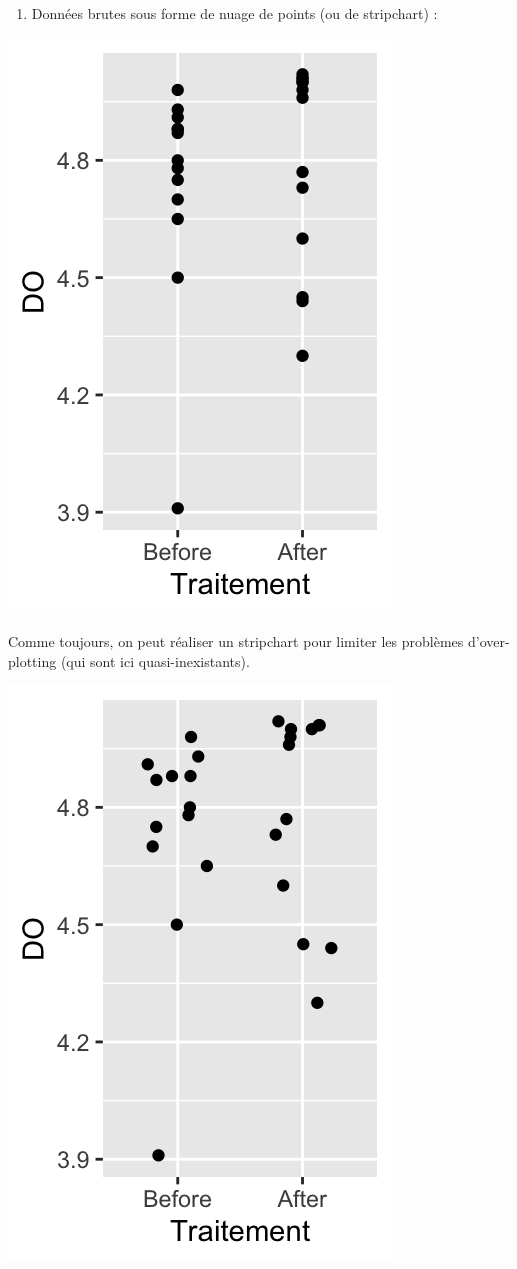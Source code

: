 \documentclass[a4paperpaper,]{article}
\newenvironment{Shaded}{\begin{snugshade}}{\end{snugshade}}
\newcommand{\DataTypeTok}[1]{\textcolor[rgb]{0.00,0.34,0.68}{#1}}
\newcommand{\DecValTok}[1]{\textcolor[rgb]{0.69,0.50,0.00}{#1}}
\newcommand{\FloatTok}[1]{\textcolor[rgb]{0.69,0.50,0.00}{#1}}
\newcommand{\KeywordTok}[1]{\textcolor[rgb]{0.12,0.11,0.11}{\textbf{#1}}}
\newcommand{\NormalTok}[1]{\textcolor[rgb]{0.12,0.11,0.11}{#1}}
\newcommand{\OperatorTok}[1]{\textcolor[rgb]{0.12,0.11,0.11}{#1}}
\newcommand{\StringTok}[1]{\textcolor[rgb]{0.75,0.01,0.01}{#1}}
\providecommand{\tightlist}{%
  \setlength{\itemsep}{0pt}\setlength{\parskip}{0pt}}
\begin{document}
\begin{enumerate}
\def\labelenumi{\arabic{enumi}.}
\tightlist
\item
  Données brutes sous forme de nuage de points (ou de stripchart) :
\end{enumerate}

\begin{Shaded}
\end{Shaded}

\begin{center}\includegraphics[width=0.25\linewidth]{figure/unnamed-chunk-31-1} \end{center}

Comme toujours, on peut réaliser un stripchart pour limiter les problèmes d'over-plotting (qui sont ici quasi-inexistants).

\begin{Shaded}
\end{Shaded}

\begin{center}\includegraphics[width=0.25\linewidth]{figure/unnamed-chunk-32-1} \end{center}
\end{document}
